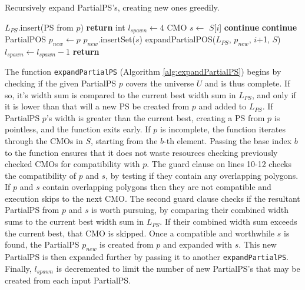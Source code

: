 \begin{algorithm}[htb]
\caption{Recursively expand PartialPS's, creating new ones greedily.}\label{alg:expandPartialPS}
\begin{algorithmic}[1]
			\State $L_{PS}$.insert(PS from $p$)
		\EndIf
		\State \textbf{return}
	\EndIf
	\State int $l_{spawn} \leftarrow 4$
		\State CMO $s \leftarrow$ $S$[$i$]
			\State \textbf{continue}
		\EndIf
			\State \textbf{continue}
		\EndIf
		\State PartialPOS $p_{new} \leftarrow p$
		\State $p_{new}$.insertSet($s$)
		\State expandPartialPOS($L_{PS}$, $p_{new}$, $i$+1, $S$)
		\State $l_{spawn} \leftarrow l_{spawn} - 1$
			\State \textbf{return}
		\EndIf
	\EndFor
\EndFunction
\end{algorithmic}
\end{algorithm}

The function \verb|expandPartialPS| (Algorithm \ref{alg:expandPartialPS}) begins by checking if the given PartialPS $p$ covers the universe $U$ and is thus complete.
If so, it's width sum is compared to the current best width sum in $L_{PS}$, and only if it is lower than that will a new PS be created from $p$ and added to $L_{PS}$.
If PartialPS $p$'s width is greater than the current best, creating a PS from $p$ is pointless, and the function exits early.
If $p$ is incomplete, the function iterates through the CMOs in $S$, starting from the $b$-th element.
Passing the base index $b$ to the function ensures that it does not waste resources checking previously checked CMOs for compatibility with $p$.
The guard clause on lines 10-12 checks the compatibility of $p$ and $s$, by testing if they contain any overlapping polygons.
If $p$ and $s$ contain overlapping polygons then they are not compatible and execution skips to the next CMO.
The second guard clause checks if the resultant PartialPS from $p$ and $s$ is worth pursuing, by comparing their combined width sums to the current best width sum in $L_{PS}$.
If their combined width sum exceeds the current best, that CMO is skipped.
Once a compatible and worthwhile $s$ is found, the PartialPS $p_{new}$ is created from $p$ and expanded with $s$.
This new PartialPS is then expanded further by passing it to another \verb|expandPartialPS|.
Finally, $l_{spawn}$ is decremented to limit the number of new PartialPS's that may be created from each input PartialPS.

